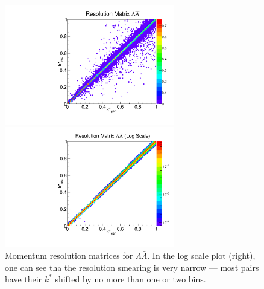 \begin{figure}[ht]
\begin{minipage}{17.5pc}
\includegraphics[width=17.5pc]{Figures/2016-07-19-ResMatrixLambdaAntiLambda.pdf}
\end{minipage}\hspace{0.5pc}
\begin{minipage}{17.5pc}
\includegraphics[width=17.5pc]{Figures/2016-07-19-ResMatrixLambdaAntiLambdaLog.pdf}
\end{minipage} 
\caption[Momentum resolution matrices -- $\Lambda\bar{\Lambda}$]{\label{fig:MomResLA} Momentum resolution matrices for $\Lambda\bar{\Lambda}$. In the log scale plot (right), one can see tha the resolution smearing is very narrow --- most pairs have their $k^*$ shifted by no more than one or two bins.}
\end{figure}

